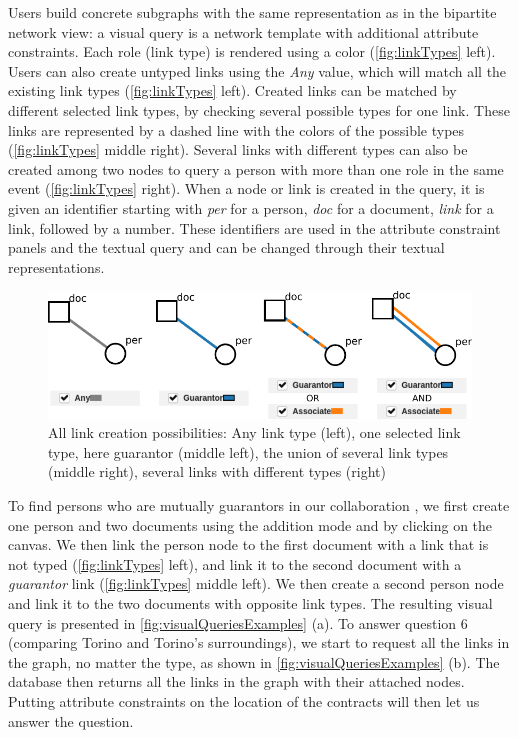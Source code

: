 Users build concrete subgraphs with the same representation as in the bipartite network view: a visual query is a network template with additional attribute constraints.
Each role (link type) is rendered using a color (\autoref{fig:linkTypes} left).
Users can also create untyped links using the \textit{Any} value, which will match all the existing link types (\autoref{fig:linkTypes} left).
Created links can be matched by different selected link types, by checking several possible types for one link.
These links are represented by a dashed line with the colors of the possible types (\autoref{fig:linkTypes} middle right).
Several links with different types can also be created among two nodes to query a person with more than one role in the same event (\autoref{fig:linkTypes} right).
When a node or link is created in the query, it is given an identifier starting with \emph{per} for a person, \emph{doc} for a document, \emph{link} for a link, followed by a number.
These identifiers are used in the attribute constraint panels and the textual query and can be changed through their textual representations.


\begin{figure}[!ht]
    \centering
    \includegraphics[width=0.9\linewidth]{static/figures/ComBiNet/OriginalPaperFigures/CGF/links.pdf}
    \caption{All link creation possibilities: Any link type (left), one selected link type, here guarantor (middle left), the union of several link types (middle right), several links with different types (right)}\label{fig:linkTypes}
\end{figure}

To find persons who are mutually guarantors in our collaboration \pascal, we first create one person and two documents using the addition mode and by clicking on the canvas.
We then link the person node to the first document with a link that is not typed (\autoref{fig:linkTypes} left), and link it to the second document with a \textit{guarantor} link (\autoref{fig:linkTypes} middle left).
We then create a second person node and link it to the two documents with opposite link types.
The resulting visual query is presented in \autoref{fig:visualQueriesExamples} (a).
To answer question 6 (comparing Torino and Torino's surroundings), we start to request all the links in the graph, no matter the type, as shown in \autoref{fig:visualQueriesExamples} (b).
The database then returns all the links in the graph with their attached nodes.
Putting attribute constraints on the location of the contracts will then let us answer the question.



